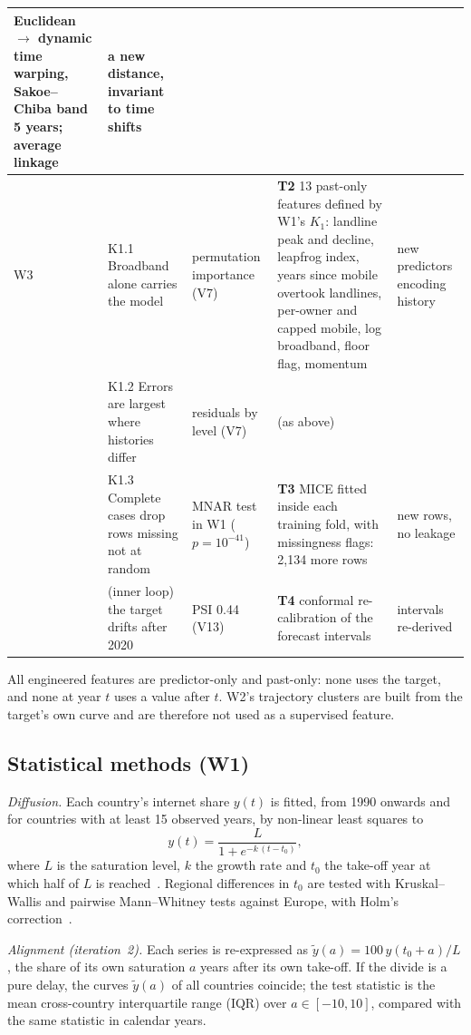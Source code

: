 \documentclass[conference,a4paper]{IEEEtran}
\begin{document}
\begin{table}[!t]
\begin{tabularx}{\textwidth}{@{}l p{3.4cm} Y Y p{3.0cm}@{}}
Euclidean $\rightarrow$ dynamic time warping, Sakoe--Chiba band 5 years; average linkage & a new
distance, invariant to time shifts \\
\midrule
W3 & K1.1 Broadband alone carries the model & permutation importance (V7) & \textbf{T2} 13 past-only
features defined by W1's $K_1$: landline peak and decline, leapfrog index, years since mobile overtook
landlines, per-owner and capped mobile, log broadband, floor flag, momentum & new predictors encoding
history \\
& K1.2 Errors are largest where histories differ & residuals by level (V7) & (as above) & \\
& K1.3 Complete cases drop rows missing not at random & MNAR test in W1 ($p=10^{-41}$) & \textbf{T3} MICE fitted inside each
training fold, with missingness flags: 2{,}134 more rows & new rows, no leakage \\
& (inner loop) the target drifts after 2020 & PSI 0.44 (V13) & \textbf{T4} conformal re-calibration
of the forecast intervals & intervals re-derived \\
\bottomrule
\end{tabularx}
\end{table}

All engineered features are predictor-only and past-only: none uses the target, and none at year $t$
uses a value after $t$. W2's trajectory clusters are built from the target's own curve and are
therefore not used as a supervised feature.

\subsection{Statistical methods (W1)}
\textit{Diffusion.} Each country's internet share $y(t)$ is fitted, from 1990 onwards and for
countries with at least 15 observed years, by non-linear least squares to
\begin{equation}
y(t)=\frac{L}{1+e^{-k\,(t-t_0)}},
\end{equation}
where $L$ is the saturation level, $k$ the growth rate and $t_0$ the take-off year at which half of
$L$ is reached~\cite{rogers2003}. Regional differences in $t_0$ are tested with Kruskal--Wallis and
pairwise Mann--Whitney tests against Europe, with Holm's correction~\cite{kruskal1952,holm1979}.

\textit{Alignment (iteration~2).} Each series is re-expressed as $\tilde y(a)=100\,y(t_0+a)/L$, the
share of its own saturation $a$ years after its own take-off. If the divide is a pure delay, the
curves $\tilde y(a)$ of all countries coincide; the test statistic is the mean cross-country
interquartile range (IQR) over $a\in[-10,10]$, compared with the same statistic in calendar years.
\end{document}
